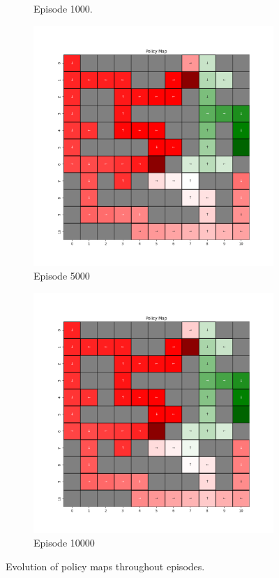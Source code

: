 \documentclass{assignment}
\begin{document}
\begin{figure}[H]
\begin{subfigure}{0.3\textwidth}
    \caption{Episode 1000.}
    \end{subfigure}\hfill
    \begin{subfigure}{0.3\textwidth}
        \includegraphics[width=\textwidth]{figures/policy_q/epsilon_sweep/policy_alpha_0.1_gamma_0.95_epsilon_0.5_iteration_5000.png}
    \caption{Episode 5000}
    \end{subfigure}\hfill
    \begin{subfigure}{0.3\textwidth}
        \includegraphics[width=\textwidth]{figures/policy_q/epsilon_sweep/policy_alpha_0.1_gamma_0.95_epsilon_0.5_iteration_10000.png}
    \caption{Episode 10000}
    \end{subfigure}
    \caption{Evolution of policy maps throughout episodes.}
    \label{fig:epsilon_0.5_q_learning_policy}
\end{figure}
\end{document}
